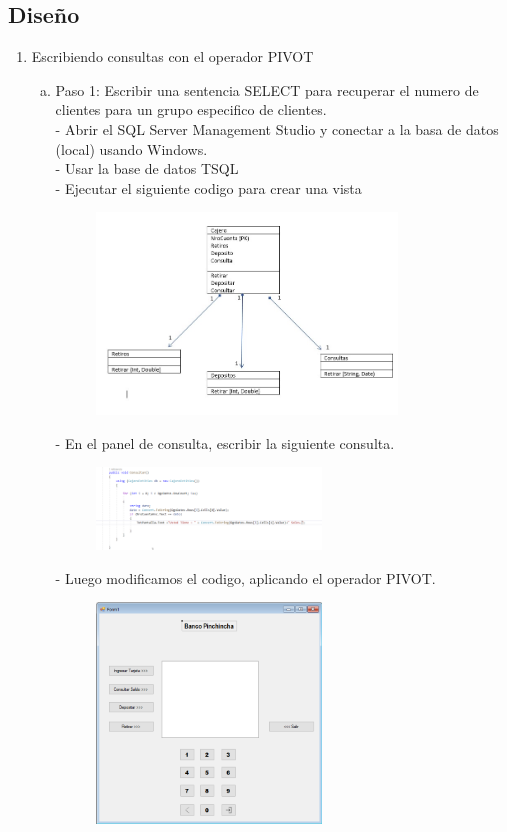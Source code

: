\subsection{Diseño}
\begin{enumerate}[1.]
	\item Escribiendo consultas con el operador PIVOT
	\begin{enumerate}[a)]
	\item Paso 1: Escribir una sentencia SELECT para recuperar el numero de clientes para un grupo especifico de clientes.\\
		-  Abrir el SQL Server Management Studio y conectar a la basa de datos (local) usando Windows.\\
		-  Usar la base de datos TSQL\\
		-  Ejecutar el siguiente codigo para crear una vista\\
		\begin{figure}[H]
		\begin{center}
		\includegraphics[width=8cm]{./Imagenes/img1}
		\end{center}
		\end{figure}
		-  En el panel de consulta, escribir la siguiente consulta.
		\begin{figure}[H]
		\begin{center}
		\includegraphics[width=6cm]{./Imagenes/img16}
		\end{center}
		\end{figure}
		-  Luego modificamos el codigo, aplicando el operador PIVOT.
		\begin{figure}[H]
		\begin{center}
		\includegraphics[width=6cm]{./Imagenes/img2}

\end{center}
\end{figure}
\end{enumerate}
\end{enumerate}
